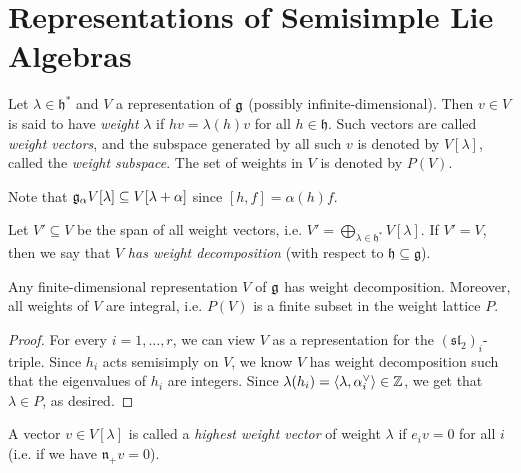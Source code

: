 \section{Representations of Semisimple Lie Algebras}

\begin{definition}
  Let $\lambda \in \mathfrak{h}^*$
  and $V$ a representation of $\mathfrak{g}$
  (possibly infinite-dimensional).
  Then $v \in V$ is said to have
  \emph{weight} $\lambda$ if
  $hv = \lambda(h) v$ for all $h \in \mathfrak{h}$.
  Such vectors are called \emph{weight vectors},
  and the subspace generated by all
  such $v$ is denoted by
  $V[\lambda]$, called the
  \emph{weight subspace}.
  The set of weights in $V$ is
  denoted by $P(V)$.
\end{definition}

\begin{remark}
  Note that
  $\mathfrak{g}_\alpha V[\lambda] \subseteq V[\lambda + \alpha]$
  since $[h, f] = \alpha(h) f$.
\end{remark}

\begin{definition}
  Let $V' \subseteq V$ be the span of
  all weight vectors, i.e.
  $V' = \bigoplus_{\lambda \in \mathfrak{h}^*} V[\lambda]$.
  If $V' = V$, then we say that
  $V$ \emph{has weight decomposition}
  (with respect to $\mathfrak{h} \subseteq \mathfrak{g}$).
\end{definition}

\begin{prop}
  Any finite-dimensional representation
  $V$ of $\mathfrak{g}$ has weight decomposition.
  Moreover, all weights of $V$ are
  integral, i.e.
  $P(V)$ is a finite subset
  in the weight lattice $P$.
\end{prop}

\begin{proof}
  For every $i = 1, \dots, r$,
  we can view
  $V$ as a representation for
  the $(\mathfrak{sl}_2)_i$-triple.
  Since $h_i$ acts semisimply on
  $V$, we know $V$ has weight
  decomposition such that the
  eigenvalues of $h_i$ are integers.
  Since
  $\lambda(h_i)
    = \langle \lambda, \alpha_i^\vee \rangle \in \mathbb{Z}$,
  we get that $\lambda \in P$,
  as desired.
\end{proof}

\begin{definition}
  A vector $v \in V[\lambda]$
  is called a \emph{highest weight vector}
  of weight $\lambda$ if
  $e_i v = 0$ for all $i$
  (i.e. if we have
  $\mathfrak{n}_+ v = 0$).
\end{definition}
